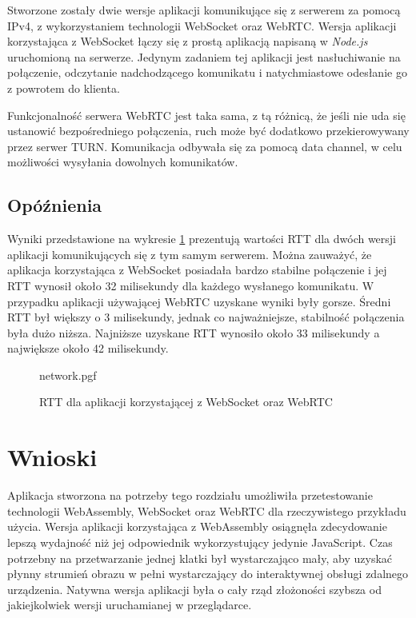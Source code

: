 \documentclass[language=polish,type=master]{aghmodern}
\begin{document}
Stworzone zostały dwie wersje aplikacji komunikujące się z serwerem za pomocą IPv4, z wykorzystaniem technologii WebSocket oraz WebRTC.
Wersja aplikacji korzystająca z WebSocket łączy się z prostą aplikacją napisaną w \emph{Node.js}\footnotemark{} uruchomioną na serwerze.
Jedynym zadaniem tej aplikacji jest nasłuchiwanie na połączenie, odczytanie nadchodzącego komunikatu i natychmiastowe odesłanie go z powrotem do klienta.

Funkcjonalność serwera WebRTC jest taka sama, z tą różnicą, że jeśli nie uda się ustanowić bezpośredniego połączenia, ruch może być dodatkowo przekierowywany przez serwer TURN.
Komunikacja odbywała się za pomocą data channel, w celu możliwości wysyłania dowolnych komunikatów.

\subsection{Opóźnienia}
Wyniki przedstawione na wykresie \ref{fig:network} prezentują wartości RTT dla dwóch wersji aplikacji komunikujących się z tym samym serwerem.
Można zauważyć, że aplikacja korzystająca z WebSocket posiadała bardzo stabilne połączenie i jej RTT wynosił około 32 milisekundy dla każdego wysłanego komunikatu.
W przypadku aplikacji używającej WebRTC uzyskane wyniki były gorsze.
Średni RTT był większy o 3 milisekundy, jednak co najważniejsze, stabilność połączenia była dużo niższa.
Najniższe uzyskane RTT wynosiło około 33 milisekundy a największe około 42 milisekundy.

\begin{figure}[H]
    \centering
    {network.pgf}
    \vspace*{5pt}
    \caption{RTT dla aplikacji korzystającej z WebSocket oraz WebRTC}
    \label{fig:network}
\end{figure}

\section{Wnioski}
Aplikacja stworzona na potrzeby tego rozdziału umożliwiła przetestowanie technologii WebAssembly, WebSocket oraz WebRTC dla rzeczywistego przykładu użycia.
Wersja aplikacji korzystająca z WebAssembly osiągnęła zdecydowanie lepszą wydajność niż jej odpowiednik wykorzystujący jedynie JavaScript.
Czas potrzebny na przetwarzanie jednej klatki był wystarczająco mały, aby uzyskać płynny strumień obrazu w pełni wystarczający do interaktywnej obsługi zdalnego urządzenia.
Natywna wersja aplikacji była o cały rząd złożoności szybsza od jakiejkolwiek wersji uruchamianej w przeglądarce.
\end{document}

